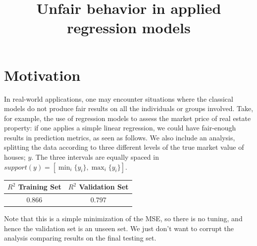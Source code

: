 \documentclass{article}
\title{Unfair behavior in applied regression models}
\date{}
\begin{document}
\newcommand{\norm}[2][{}]{\left\|#2\right\|_{#1}}


\maketitle

\section*{Motivation}

In real-world applications, one may encounter situations where the classical models do not produce fair results on all the individuals or groups involved. Take, for example, the use of regression models to assess the market price of real estate property: if one applies a simple linear regression, we could have fair-enough results in prediction metrics, as seen as follows. We also include an analysis, splitting the data according to three different levels of the true market value of houses; $y$. The three intervals are equally spaced in $support(y)=[\min_i\{y_i\}, \max_i\{y_i\}]$.

\begin{table}[!h]
    \centering
    \begin{tabular}{c|c}
       $R^2$ Training Set  & $R^2$ Validation Set \\
       \hline
      0.866 &   0.797
    \end{tabular}
\end{table}
Note that this is a simple minimization of the MSE, so there is no tuning, and hence the validation set is an unseen set. We just don't want to corrupt the analysis comparing results on the final testing set.
\end{document}
